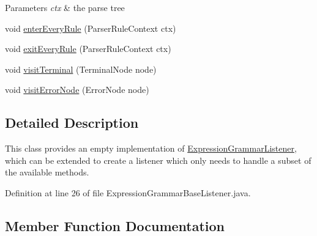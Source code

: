 \begin{DoxyCompactItemize}
\begin{DoxyCompactList}
\begin{DoxyParams}{Parameters}
{\em ctx} & the parse tree\\
\hline
\end{DoxyParams}
 \end{DoxyCompactList}\item 
void \hyperlink{classgov_1_1nasa_1_1jpf_1_1inspector_1_1server_1_1expression_1_1parser_1_1_expression_grammar_base_listener_a1a549a945222c4e9319d3e779c2e18d0}{enter\+Every\+Rule} (Parser\+Rule\+Context ctx)
\item 
void \hyperlink{classgov_1_1nasa_1_1jpf_1_1inspector_1_1server_1_1expression_1_1parser_1_1_expression_grammar_base_listener_a1c4c5f7584ab5ffdc6856d646b87774b}{exit\+Every\+Rule} (Parser\+Rule\+Context ctx)
\item 
void \hyperlink{classgov_1_1nasa_1_1jpf_1_1inspector_1_1server_1_1expression_1_1parser_1_1_expression_grammar_base_listener_ac5282abeefa505a9fbf5164b95bac1fb}{visit\+Terminal} (Terminal\+Node node)
\item 
void \hyperlink{classgov_1_1nasa_1_1jpf_1_1inspector_1_1server_1_1expression_1_1parser_1_1_expression_grammar_base_listener_a64214b17c68bb62694b7b228d8b83eb9}{visit\+Error\+Node} (Error\+Node node)
\end{DoxyCompactItemize}


\subsection{Detailed Description}
This class provides an empty implementation of \hyperlink{interfacegov_1_1nasa_1_1jpf_1_1inspector_1_1server_1_1expression_1_1parser_1_1_expression_grammar_listener}{Expression\+Grammar\+Listener}, which can be extended to create a listener which only needs to handle a subset of the available methods. 

Definition at line 26 of file Expression\+Grammar\+Base\+Listener.\+java.



\subsection{Member Function Documentation}
